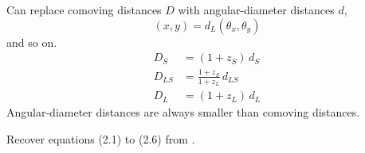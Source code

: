 \documentclass[12pt,preprint]{aastex}
\begin{document}
Can replace comoving distances $D$ with angular-diameter distances
$d$,
\begin{equation}
(x,y) = d_L (\theta_x,\theta_y)
\end{equation}
and so on.
\begin{equation}
\begin{aligned}
D_S &= (1+z_S) \, d_S \\
D_{LS} &= \frac{1+z_S}{1+z_L} \, d_{LS} \\
D_L &= (1+z_L) \, d_L
\end{aligned}
\end{equation}
Angular-diameter distances are always smaller than comoving distances.

Recover equations (2.1) to (2.6) from \cite{1986ApJ...310..568B}.

\newpage




\newpage
\end{document}
